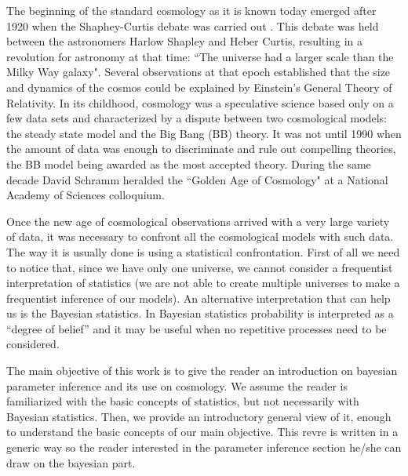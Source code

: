 \documentclass[onecolumn,           %
               showpacs,            %
               preprintnumbers,     %
               aps,                 %
               letterpaper,             %
               superscriptaddress,      %
               nofootinbib,         %
               tightenlines,        %
               floats,floatfix      %
               ,usenatbib,
               ]{revtex4-1}
\begin{document}
The beginning of the standard cosmology as it is known today emerged after 1920 when the Shaphey-Curtis debate was carried out \cite{debate}. This debate was held between the astronomers Harlow Shapley and Heber Curtis, resulting in a revolution for astronomy at that time: ``The universe had a larger scale than the Milky Way galaxy". Several observations at that epoch established that the size and dynamics of the cosmos could be explained by Einstein's General Theory of Relativity. In its childhood, cosmology was a speculative science based only on a few data sets and characterized by a dispute between two cosmological models: the steady state model and the Big Bang (BB) theory. It was not until 1990 when the amount of data was enough to discriminate and rule out compelling theories, the BB model being awarded as the most accepted theory. During the same decade David Schramm heralded the ``Golden Age of Cosmology" at a National Academy of Sciences colloquium.    

Once the new age of cosmological observations arrived with a very large variety of data, it was necessary to confront all the cosmological models with such data. The way it is usually done is using a statistical confrontation. First of all we need to notice that, since we have only one universe, we cannot consider a frequentist interpretation of statistics (we are not able to create multiple universes to make a frequentist inference of our models). An alternative interpretation that can help us is the Bayesian statistics. In Bayesian statistics probability is interpreted as a ``degree of belief'' and it may be useful when no repetitive processes need to be considered.  

The main objective of this work is to give the reader an introduction on bayesian parameter inference and its use on cosmology. We assume the reader is familiarized with the basic concepts of statistics, but not necessarily with Bayesian statistics. Then, we provide an introductory general view of it, enough to understand the basic concepts of our main objective. This revre is written in a generic way so the reader interested in the parameter inference section he/she can draw on the bayesian part.  
\end{document}
